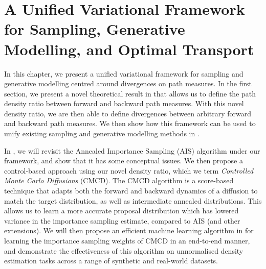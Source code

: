 \chapter[A Unified Variational Framework and Controlled Monte Carlo Diffusions]{A Unified Variational Framework for Sampling, Generative Modelling, and Optimal Transport}
\label{chapter:cmcd}
\ifpdf
    \graphicspath{{Chapter4/Figs/Raster/}{Chapter4/Figs/PDF/}{Chapter4/Figs/}}
\else
    \graphicspath{{Chapter4/Figs/Vector/}{Chapter4/Figs/}}
\fi

In this chapter, we present a unified variational framework for sampling and generative modelling centred around divergences on path measures. In the first section, we present a novel theoretical result in  that allows us to define the path density ratio between forward and backward path measures. With this novel density ratio, we are then able to define divergences between arbitrary forward and backward path measures. We then show how this framework can be used to unify existing sampling and generative modelling methods in .

In , we will revisit the Annealed Importance Sampling (AIS) algorithm under our framework, and show that it has some conceptual issues. We then propose a control-based approach using our novel density ratio, which we term \textit{Controlled Monte Carlo Diffusions} (CMCD). The CMCD algorithm is a score-based technique that adapts both the forward and backward dynamics of a diffusion to match the target distribution, as well as intermediate annealed distributions. This allows us to learn a more accurate proposal distribution which has lowered variance in the importance sampling estimate, compared to AIS (and other extensions). We will then propose an efficient machine learning algorithm in  for learning the importance sampling weights of CMCD in an end-to-end manner, and demonstrate the effectiveness of this algorithm on unnormalised density estimation tasks across a range of synthetic and real-world datasets.

